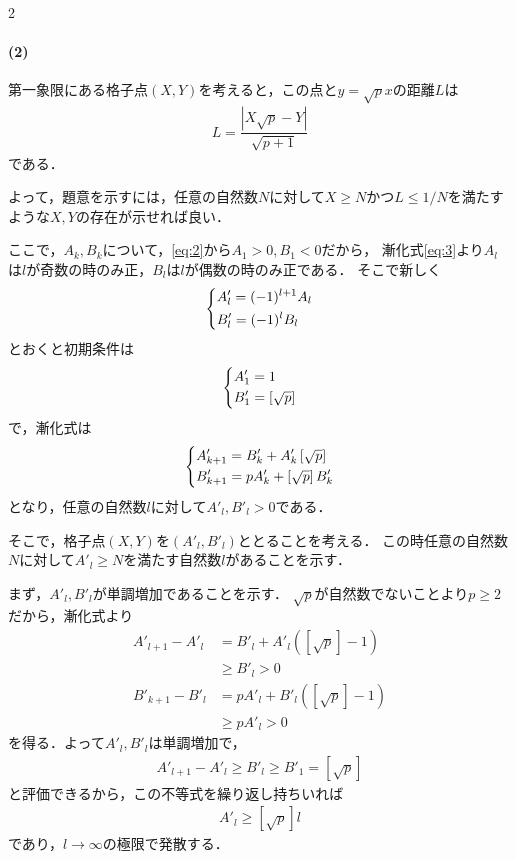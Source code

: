 \documentclass[../../main.tex]{subfiles}
\begin{document}
\begin{multicols}{2}
  \paragraph{(2)}
  第一象限にある格子点$(X,Y)$を考えると，この点と$y=\sqrt{p}x$の距離$L$は
  \begin{align}
    L=\dfrac{\left|X\sqrt{p}-Y\right|}{\sqrt{p+1}}\label{eq:4}
  \end{align}
  である．

  よって，題意を示すには，任意の自然数$N$に対して$X \ge N$かつ$L \le 1/N$を満たすような$X,Y$の存在が示せれば良い．

  ここで，$A_{k},B_{k}$について，\cref{eq:2}から$A_1>0, B_1<0$だから，
  漸化式\cref{eq:3}より$A_{l}$は$l$が奇数の時のみ正，$B_{l}$は$l$が偶数の時のみ正である．
  そこで新しく
  \begin{align}
    \begin{dcases}
      A'_{l} = (-1)^{l+1}A_{l} \\
      B'_{l} = (-1)^{l}B_{l}
    \end{dcases}
  \end{align}
  とおくと初期条件は
  \begin{align}
    \begin{dcases}
      A'_1 = 1 \\
      B'_1 = \left[\sqrt{p}\right]
    \end{dcases}\label{eq:5}
  \end{align}
  で，漸化式は
  \begin{align}
    \begin{dcases}
      A'_{k+1} = B'_{k}+A'_{k}\left[\sqrt{p}\right] \\
      B'_{k+1} = pA'_k+\left[\sqrt{p}\right]B'_{k}
    \end{dcases} \label{eq:6}
  \end{align}
  となり，任意の自然数$l$に対して$A'_{l},B'_{l}>0$である．

  そこで，格子点$(X,Y)$を$(A'_{l},B'_{l})$ととることを考える．
  この時任意の自然数$N$に対して$A'_{l} \ge N$を満たす自然数$l$があることを示す．

  まず，$A'_{l},B'_{l}$が単調増加であることを示す．
  $\sqrt{p}$が自然数でないことより$p \ge 2$だから，漸化式より
  \begin{align}
    A'_{l+1} - A'_{l}
    & = B'_{l}+A'_{l}\left(\left[\sqrt{p}\right]-1\right)  \\
    & \ge B'_{l} > 0                                       \\
    B'_{k+1} - B'_{l}
    & = pA'_{l}+B'_{l}\left(\left[\sqrt{p}\right]-1\right) \\
    & \ge pA'_{l} > 0
  \end{align}
  を得る．よって$A'_{l},B'_{l}$は単調増加で，
  \begin{align}
    A'_{l+1} - A'_{l} \ge B'_{l} \ge B'_{1} = \left[\sqrt{p}\right]
  \end{align}
  と評価できるから，この不等式を繰り返し持ちいれば
  \begin{align}
    A'_{l} \ge \left[\sqrt{p}\right] l
  \end{align}
  であり，$l\to\infty$の極限で発散する．


\end{multicols}
\end{document}
